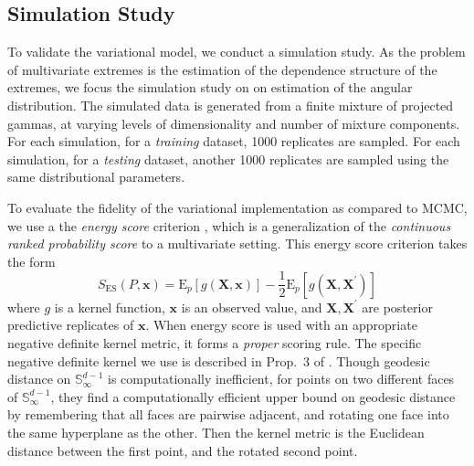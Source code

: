 \subsection{Simulation Study}
To validate the variational model, we conduct a simulation study.
    As the problem of multivariate extremes is the estimation of the dependence
    structure of the extremes, we focus the simulation study on on estimation of
    the angular distribution.  The simulated data is generated from a finite
    mixture of projected gammas, at varying levels of dimensionality and number
    of mixture components.  For each simulation, for a \emph{training} dataset,
    \num{1000} replicates are sampled.  For each simulation, for a 
    \emph{testing} dataset, another \num{1000} replicates are sampled using
    the same distributional parameters.

To evaluate the fidelity of the variational implementation as compared to MCMC, 
    we use a the \emph{energy score} criterion \citep{gneiting2007}, which is a
    generalization of the \emph{continuous ranked probability score} to a
    multivariate setting.  This energy score criterion takes the form
    \[
      S_{\text{ES}}(P, \bm{x}) = \text{E}_p\left[g(\bm{X},\bm{x})\right] - 
        \frac{1}{2}\text{E}_p\left[g(\bm{X},\bm{X}^{\prime})\right]
    \]
    where $g$ is a kernel function, $\bm{x}$ is an observed value, and 
    $\bm{X},\bm{X}^{\prime}$ are posterior predictive replicates of $\bm{x}$.
    When energy score is used with an appropriate negative definite kernel 
    metric, it forms a \emph{proper} scoring rule. The specific negative 
    definite kernel we use is described in Prop.~3 of \cite{trubey:pg}.  Though 
    geodesic distance on $\mathbb{S}_{\infty}^{d-1}$ is computationally inefficient,
    for points on two different faces of $\mathbb{S}_{\infty}^{d-1}$,
    they find a computationally efficient upper bound on geodesic distance by 
    remembering that all faces are pairwise adjacent, and rotating one face into the
    same hyperplane as the other.  Then the kernel metric is the Euclidean distance
    between the first point, and the rotated second point.
    
